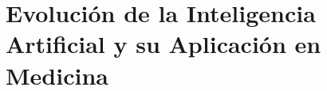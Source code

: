 



\section{Evolución de la Inteligencia Artificial y su Aplicación en Medicina} \label{sec:evol} %

